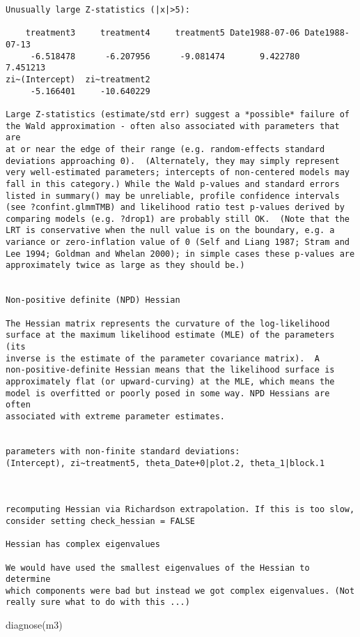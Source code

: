 \documentclass[
  letterpaper,
  DIV=11,
  numbers=noendperiod]{scrreprt}
\newenvironment{Shaded}{\begin{snugshade}}{\end{snugshade}}
\newcommand{\FunctionTok}[1]{\textcolor[rgb]{0.28,0.35,0.67}{#1}}
\newcommand{\NormalTok}[1]{\textcolor[rgb]{0.00,0.23,0.31}{#1}}
\begin{document}
\begin{verbatim}
Unusually large Z-statistics (|x|>5):

    treatment3     treatment4     treatment5 Date1988-07-06 Date1988-07-13 
     -6.518478      -6.207956      -9.081474       9.422780       7.451213 
zi~(Intercept)  zi~treatment2 
     -5.166401     -10.640229 

Large Z-statistics (estimate/std err) suggest a *possible* failure of
the Wald approximation - often also associated with parameters that are
at or near the edge of their range (e.g. random-effects standard
deviations approaching 0).  (Alternately, they may simply represent
very well-estimated parameters; intercepts of non-centered models may
fall in this category.) While the Wald p-values and standard errors
listed in summary() may be unreliable, profile confidence intervals
(see ?confint.glmmTMB) and likelihood ratio test p-values derived by
comparing models (e.g. ?drop1) are probably still OK.  (Note that the
LRT is conservative when the null value is on the boundary, e.g. a
variance or zero-inflation value of 0 (Self and Liang 1987; Stram and
Lee 1994; Goldman and Whelan 2000); in simple cases these p-values are
approximately twice as large as they should be.)


Non-positive definite (NPD) Hessian

The Hessian matrix represents the curvature of the log-likelihood
surface at the maximum likelihood estimate (MLE) of the parameters (its
inverse is the estimate of the parameter covariance matrix).  A
non-positive-definite Hessian means that the likelihood surface is
approximately flat (or upward-curving) at the MLE, which means the
model is overfitted or poorly posed in some way. NPD Hessians are often
associated with extreme parameter estimates.


parameters with non-finite standard deviations:
(Intercept), zi~treatment5, theta_Date+0|plot.2, theta_1|block.1



recomputing Hessian via Richardson extrapolation. If this is too slow, consider setting check_hessian = FALSE 

Hessian has complex eigenvalues

We would have used the smallest eigenvalues of the Hessian to determine
which components were bad but instead we got complex eigenvalues. (Not
really sure what to do with this ...)
\end{verbatim}

\begin{Shaded}
\begin{Highlighting}[]
\FunctionTok{diagnose}\NormalTok{(m3)}
\end{Highlighting}
\end{Shaded}
\end{document}
